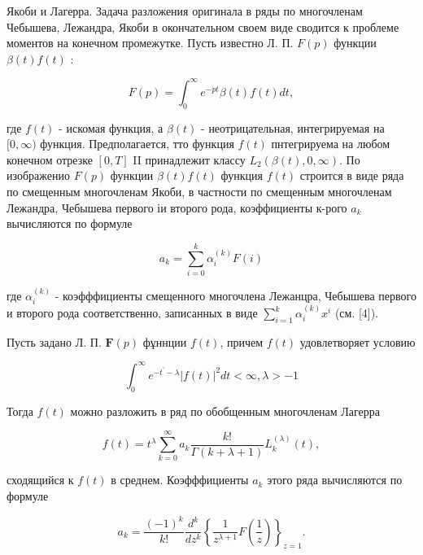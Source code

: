 \documentclass[10pt]{article}
\begin{document}
Якоби и Лагерра. Задача разложения оригинала в ряды по многочленам Чебышева, Лежандра, Якоби в окончательном своем виде сводится к проблеме моментов на конечном промежутке. Пусть известно Л. П. $F(p)$ функции $\beta(t) f(t)$ :



\[

F(p)=\int_{0}^{\infty} e^{-p t} \beta(t) f(t) d t,

\]



где $f(t)$ - искомая функция, а $\beta(t)$ - неотрицательная, интегрируемая на $[0, \infty)$ функция. Предполагается, тто функция $f(t)$ пнтегрируема на любом конечном отрезке $[0, T]$ II принадлежит классу $L_{2}(\beta(t), 0, \infty)$. По изображенио $F(p)$ функции $\beta(t) f(t)$ функция $f(t)$ строится в виде ряда по смещенным многочленам Якоби, в частности по смещенным многочленам Лежандра, Чебышева первого іи второго рода, коэффициенты к-рого $a_{k}$ вычисляются по формуле



\[

a_{k}=\sum_{i=0}^{k} \alpha_{i}^{(k)} F(i)

\]



где $\alpha_{i}^{(k)}$ - коэфффициенты смещенного многочлена Лежанцра, Чебышева первого и второго рода соответственно, записанных в виде $\sum_{i=1}^{k} \alpha_{i}^{(k)} x^{i}$ (см. [4]).



Пусть задано Л. П. $\boldsymbol{F}(p)$ фұннции $f(t)$, причем $f(t)$ удовлетворяет условию



\[

\int_{0}^{\infty} e^{-t^{\prime}-\lambda}|f(t)|^{2} d t<\infty, \lambda>-1

\]



Тогда $f(t)$ можно разложить в ряд по обобщенным многочленам Лагерра



\[

f(t)=t^{\lambda} \sum_{k=0}^{\infty} a_{k} \frac{k !}{\Gamma(k+\lambda+1)} L_{k}^{(\lambda)}(t),

\]



сходящийся к $f(t)$ в среднем. Коэфффициенты $a_{k}$ этого ряда вычисляются по формуле



\[

a_{k}=\frac{(-1)^{k}}{k !} \frac{d^{k}}{d z^{k}}\left\{\frac{1}{z^{\lambda+1}} F\left(\frac{1}{z}\right)\right\}_{z=1} .

\]
\end{document}
